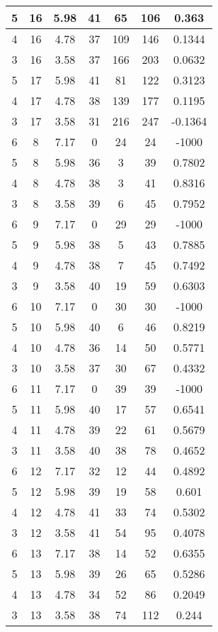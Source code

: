 \documentclass[letterpaper, 12pt]{article}
\begin{document}
\begin{longtable}{|c|c|c|c|c|c|c|}
\hline
5 & 16 & 5.98 & 41 & 65 & 106 & 0.363 \\
\hline
4 & 16 & 4.78 & 37 & 109 & 146 & 0.1344 \\
\hline
3 & 16 & 3.58 & 37 & 166 & 203 & 0.0632 \\
\hline
5 & 17 & 5.98 & 41 & 81 & 122 & 0.3123 \\
\hline
4 & 17 & 4.78 & 38 & 139 & 177 & 0.1195 \\
\hline
3 & 17 & 3.58 & 31 & 216 & 247 & -0.1364 \\
\hline
6 & 8 & 7.17 & 0 & 24 & 24 & -1000 \\
\hline
5 & 8 & 5.98 & 36 & 3 & 39 & 0.7802 \\
\hline
4 & 8 & 4.78 & 38 & 3 & 41 & 0.8316 \\
\hline
3 & 8 & 3.58 & 39 & 6 & 45 & 0.7952 \\
\hline
6 & 9 & 7.17 & 0 & 29 & 29 & -1000 \\
\hline
5 & 9 & 5.98 & 38 & 5 & 43 & 0.7885 \\
\hline
4 & 9 & 4.78 & 38 & 7 & 45 & 0.7492 \\
\hline
3 & 9 & 3.58 & 40 & 19 & 59 & 0.6303 \\
\hline
6 & 10 & 7.17 & 0 & 30 & 30 & -1000 \\
\hline
5 & 10 & 5.98 & 40 & 6 & 46 & 0.8219 \\
\hline
4 & 10 & 4.78 & 36 & 14 & 50 & 0.5771 \\
\hline
3 & 10 & 3.58 & 37 & 30 & 67 & 0.4332 \\
\hline
6 & 11 & 7.17 & 0 & 39 & 39 & -1000 \\
\hline
5 & 11 & 5.98 & 40 & 17 & 57 & 0.6541 \\
\hline
4 & 11 & 4.78 & 39 & 22 & 61 & 0.5679 \\
\hline
3 & 11 & 3.58 & 40 & 38 & 78 & 0.4652 \\
\hline
6 & 12 & 7.17 & 32 & 12 & 44 & 0.4892 \\
\hline
5 & 12 & 5.98 & 39 & 19 & 58 & 0.601 \\
\hline
4 & 12 & 4.78 & 41 & 33 & 74 & 0.5302 \\
\hline
3 & 12 & 3.58 & 41 & 54 & 95 & 0.4078 \\
\hline
6 & 13 & 7.17 & 38 & 14 & 52 & 0.6355 \\
\hline
5 & 13 & 5.98 & 39 & 26 & 65 & 0.5286 \\
\hline
4 & 13 & 4.78 & 34 & 52 & 86 & 0.2049 \\
\hline
3 & 13 & 3.58 & 38 & 74 & 112 & 0.244 \\

\end{longtable}
\end{document}
